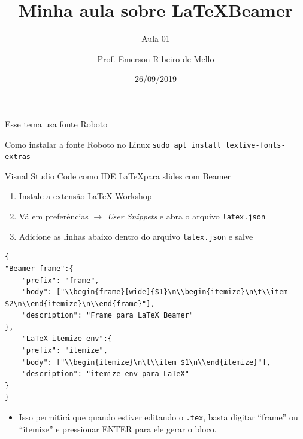 \documentclass{beamer}
\title{Minha aula sobre \LaTeX Beamer}
\subtitle{Aula 01}
\author{Prof. Emerson Ribeiro de Mello}
\institute{
\href{mello@ifsc.edu.br}{mello@ifsc.edu.br}
}
\date{26/09/2019}
\begin{document}
 \begin{frame}[t]\maketitle\end{frame}




\jsonp
\lstset{numbers=none}

\begin{frame}[wide]{Esse tema usa fonte Roboto}
\begin{alertblock}{Como instalar a fonte Roboto no Linux}
     \texttt{sudo apt install texlive-fonts-extras}
\end{alertblock}
\end{frame}

\begin{frame}{Visual Studio Code como IDE \LaTeX para slides com Beamer}
\begin{enumerate}
    \item Instale a extensão LaTeX Workshop
    \item Vá em preferências \(\rightarrow\) \textit{User Snippets} e abra o arquivo \texttt{latex.json}
    \item Adicione as linhas abaixo dentro do arquivo \texttt{latex.json} e salve
\end{enumerate}

\begin{lstlisting}
{
"Beamer frame":{
    "prefix": "frame",
    "body": ["\\begin{frame}[wide]{$1}\n\\begin{itemize}\n\t\\item $2\n\\end{itemize}\n\\end{frame}"],
    "description": "Frame para LaTeX Beamer"
},
    "LaTeX itemize env":{
    "prefix": "itemize",
    "body": ["\\begin{itemize}\n\t\\item $1\n\\end{itemize}"],
    "description": "itemize env para LaTeX"
}
}
\end{lstlisting}
\begin{itemize}
    \item Isso permitirá que quando estiver editando o \texttt{.tex},  basta digitar ``frame'' ou ``itemize'' e pressionar ENTER para ele gerar o bloco.
\end{itemize}
\end{frame}
\end{document}
